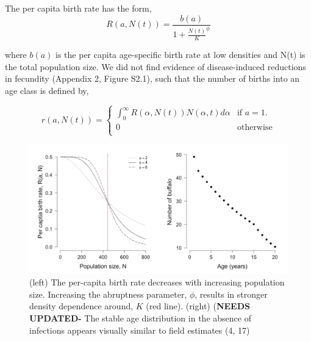 \documentclass{article}
\begin{document}
The per capita birth rate has the form, \\
\begin{equation}
R(a, N(t)) = \frac{b(a)}{1 + \frac{N(t)}{K}^\phi}
\end{equation}

where $b(a)$ is the per capita age-specific birth rate at low densities and N(t) is the total population size. We did not find evidence of disease-induced reductions in fecundity (Appendix 2, Figure S2.1), such that the number of births into an age class is defined by,

\begin{equation}
r(a, N(t)) = 
\begin{cases}
\int_{0}^{\infty}  R(\alpha, N(t))N(\alpha, t) d\alpha & \text{if $a = 1.$} \\
0 & \text{otherwise} \\
\end{cases}
\end{equation}


\begin{figure}
  \centering
  \includegraphics[width = \textwidth]{FigureC1_placeholder.pdf}
  \caption{(left) The per-capita birth rate decreases with increasing population size.  Increasing the abruptness parameter, $\phi$, results in stronger density dependence around, $K$ (red line). (right) (\textbf{NEEDS UPDATED- } The stable age distribution in the absence of infections appears visually similar to field estimates (4, 17)}
  \label{Figure S3.1}
\end{figure}
\end{document}
